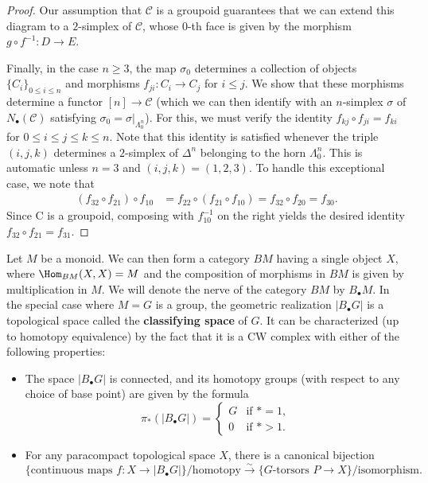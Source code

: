 \begin{proof}
Our assumption that $\mathcal{C}$ is a groupoid guarantees that we can extend this diagram to a $2$-simplex of $\mathcal{C}$, whose $0$-th face is given by the morphism $g\circ f^{-1}:D\to E$.\par
Finally, in the case $n\geq 3$, the map $\sigma_0$ determines a collection of objects $\{C_i\}_{0\leq i\leq n}$ and morphisms $f_{ji}:C_i\to C_j$ for $i\leq j$. We show that these morphisms determine a functor $[n]\to\mathcal{C}$ (which we can then identify with an $n$-simplex $\sigma$ of $N_\bullet(\mathcal{C})$ satisfying $\sigma_0=\sigma|_{\Lambda^n_0}$). For this, we must verify the identity $f_{kj}\circ f_{ji}=f_{ki}$ for $0\leq i\leq j\leq k\leq n$. Note that this identity is satisfied whenever the triple $(i,j,k)$ determines a $2$-simplex of $\Delta^n$ belonging to the horn $\Lambda^n_0$. This is automatic unless $n=3$ and $(i,j,k)=(1,2,3)$. To handle this exceptional case, we note that
\begin{align*}
(f_{32}\circ f_{21})\circ f_{10}&=f_{22}\circ (f_{21}\circ f_{10})=f_{32}\circ f_{20}=f_{30}.
\end{align*}
Since C is a groupoid, composing with $f_{10}^{-1}$ on the right yields the desired identity $f_{32}\circ f_{21}=f_{31}$.
\end{proof}
\begin{example}
Let $M$ be a monoid. We can then form a category $BM$ having a single object $X$, where $\Hom_{BM}(X,X)=M$ and the composition of morphisms in $BM$ is given by multiplication in $M$. We will denote the nerve of the category $BM$ by $B_\bullet M$. In the special case where $M=G$ is a group, the geometric realization $|B_\bullet G|$ is a topological space called the \textbf{classifying space} of $G$. It can be characterized (up to homotopy equivalence) by the fact that it is a CW complex with either of the following properties:
\begin{itemize}
\item The space $|B_\bullet G|$ is connected, and its homotopy groups (with respect to any choice of base point) are given by the formula
\[\pi_*(|B_\bullet G|)=\begin{cases}
G&\text{if $\ast=1$},\\
0&\text{if $\ast>1$}.
\end{cases}\]
\item For any paracompact topological space $X$, there is a canonical bijection
\[\{\text{continuous maps $f:X\to|B_\bullet G|$}\}/\text{homotopy}\stackrel{\sim}{\to}\{\text{$G$-torsors $P\to X$}\}/\text{isomorphism}.\]
\end{itemize}
\end{example}
